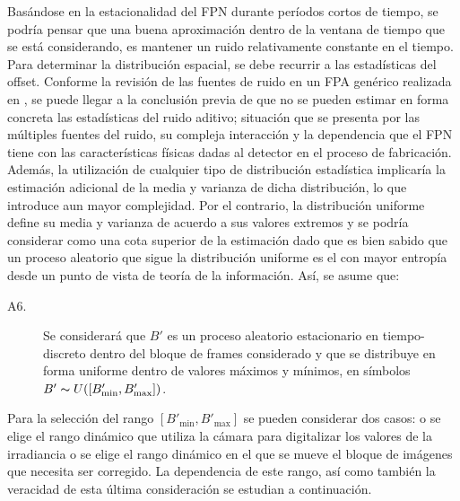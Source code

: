 Basándose en la estacionalidad del \ac{FPN} durante períodos cortos de tiempo, se podría pensar que una buena aproximación dentro de la ventana de tiempo que se está considerando, es mantener un ruido relativamente constante en el tiempo. Para determinar la distribución espacial, se debe recurrir a las estadísticas del offset. Conforme la revisión de las fuentes de ruido en un \ac{FPA} genérico realizada en \cite{godoy-thesis}, se puede llegar a la conclusión previa de que no se pueden estimar en forma concreta las estadísticas del ruido aditivo; situación que se presenta por las múltiples fuentes del ruido, su compleja interacción y la dependencia que el \ac{FPN} tiene con las características físicas dadas al detector en el proceso de fabricación. Además, la utilización de cualquier tipo de distribución estadística implicaría la estimación adicional de la media y varianza de dicha distribución, lo que introduce aun mayor complejidad. Por el contrario, la distribución uniforme define su media y varianza de acuerdo a sus valores extremos y se podría considerar como una cota superior de la estimación dado que es bien sabido que un proceso aleatorio que sigue la distribución uniforme es el con mayor entropía desde un punto de vista de teoría de la información. Así, se asume que:

\begin{description}
 \item[A6.] Se considerará que $B'$ es un proceso aleatorio estacionario en tiempo-discreto dentro del bloque de frames considerado y que se distribuye en forma uniforme dentro de valores máximos y mínimos, en símbolos $B'\thicksim U([B'_{\min},B'_{\max}])$.
\end{description}


Para la selección del rango $[B'_{\min},B'_{\max}]$ se pueden considerar dos casos: o se elige el rango dinámico que utiliza la cámara para digitalizar los valores de la irradiancia o se elige el rango dinámico en el que se mueve el bloque de imágenes que necesita ser corregido. La dependencia de este rango, así como también la veracidad de esta última consideración se estudian a continuación.



